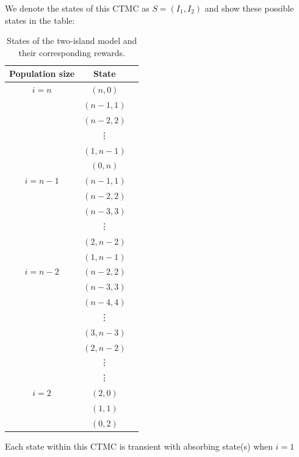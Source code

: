 \documentclass[12pt,a4paper]{article}
\begin{document}
We denote the states of this CTMC as $S=(I_1,I_2)$ and show these possible states in the table:

\begin{table}[h!]
\begin{center}
\begin{tabular}{ |c|c|c| } 
 \hline
 Population size & State  \\
 \hline
$i=n$ & $(n,0)$   \\ 
      & $(n-1,1)$  \\ 
      & $(n-2,2)$  \\ 
      & \vdots \\
      & $(1,n-1)$  \\
      & $(0,n)$  \\
\hline
$i=n-1$ & $(n-1,1)$ \\
 & $(n-2,2)$  \\
 & $(n-3,3)$  \\
 & \vdots   \\
  & $(2,n-2)$ \\
 & $(1,n-1)$ \\
 \hline 
 $i=n-2$ & $(n-2,2)$ \\
 & $(n-3,3)$  \\
 & $(n-4,4)$ \\
 & \vdots  \\
& $(3,n-3)$ \\
& $(2,n-2)$ \\
\hline 
& \vdots  \\
& \vdots  \\
\hline 
$i=2$ & $(2,0)$  \\
& $(1,1)$  \\
& $(0,2)$  \\
\hline
\end{tabular}
\caption{States of the two-island model and their corresponding rewards.}
\label{StatesTable}
\end{center}
\end{table}

Each state within this CTMC is transient with absorbing state(s) when $i=1$
\end{document}
